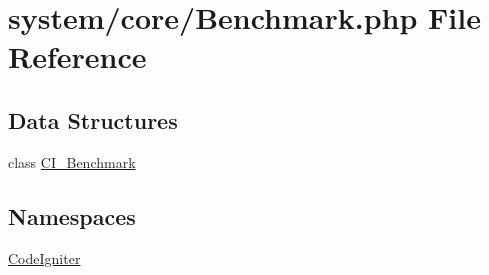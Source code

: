 \hypertarget{_benchmark_8php}{}\section{system/core/\+Benchmark.php File Reference}
\label{_benchmark_8php}
\subsection*{Data Structures}
\begin{DoxyCompactItemize}
\item 
class \mbox{\hyperlink{class_c_i___benchmark}{C\+I\+\_\+\+Benchmark}}
\end{DoxyCompactItemize}
\subsection*{Namespaces}
\begin{DoxyCompactItemize}
\item 
 \mbox{\hyperlink{namespace_code_igniter}{Code\+Igniter}}
\end{DoxyCompactItemize}
